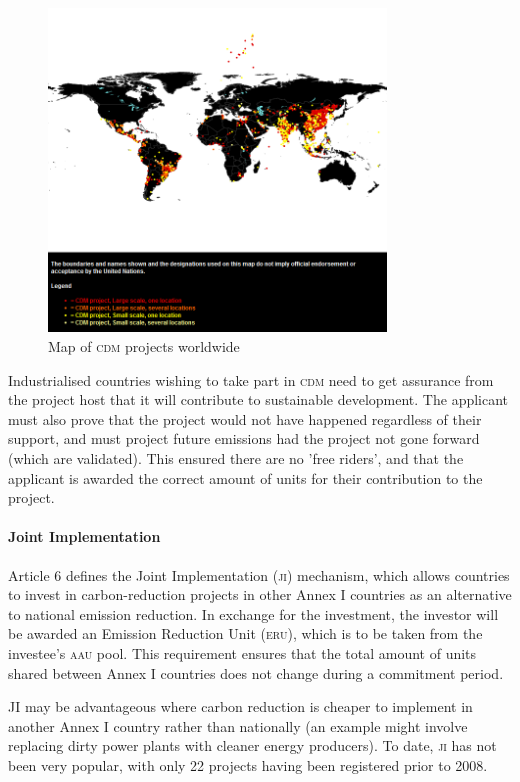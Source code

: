 \begin{figure}[h!]
	\centering
	\includegraphics[width=0.8\textwidth]{img/CDM_Map.png}
	\caption{Map of \textsc{cdm} projects worldwide~\cite{UNFCCC-CDM-map}}
	\label{fig:cdm_map}
\end{figure}

Industrialised countries wishing to take part in \textsc{cdm} need to get assurance from the project host that it will contribute to sustainable development. The applicant must also prove that the project would not have happened regardless of their support, and must project future emissions had the project not gone forward (which are validated). This ensured there are no 'free riders', and that the applicant is awarded the correct amount of units for their contribution to the project.

\paragraph{Joint Implementation}

Article 6 defines the Joint Implementation (\textsc{ji}) mechanism, which allows countries to invest in carbon-reduction projects in other Annex I countries as an alternative to national emission reduction. In exchange for the investment, the investor will be awarded an Emission Reduction Unit (\textsc{eru}), which is to be taken from the investee's \textsc{aau} pool. This requirement ensures that the total amount of units shared between Annex I countries does not change during a commitment period.

JI may be advantageous where carbon reduction is cheaper to implement in another Annex I country rather than nationally (an example might involve replacing dirty power plants with cleaner energy producers). To date, \textsc{ji} has not been very popular, with only 22 projects having been registered prior to 2008.

